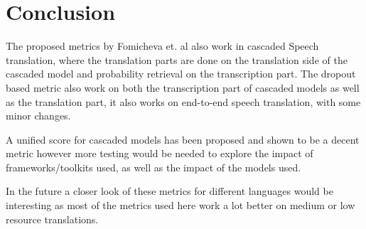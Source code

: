 
\chapter{Conclusion}
\label{ch:Conclusion}
The proposed metrics by Fomicheva et. al \cite{fomicheva2020unsupervised} also work in cascaded Speech translation, where the translation parts are done on the translation side of the cascaded model and probability retrieval on the transcription part. The dropout based metric also work on both the transcription part of cascaded models as well as the translation part, it also works on end-to-end speech translation, with some minor changes.

A unified score for cascaded models has been proposed and shown to be a decent metric however more testing would be needed to explore the impact of frameworks/toolkits used, as well as the impact of the models used. 

In the future a closer look of these metrics for different languages would be interesting as most of the metrics used here work a lot better on medium or low resource translations.



